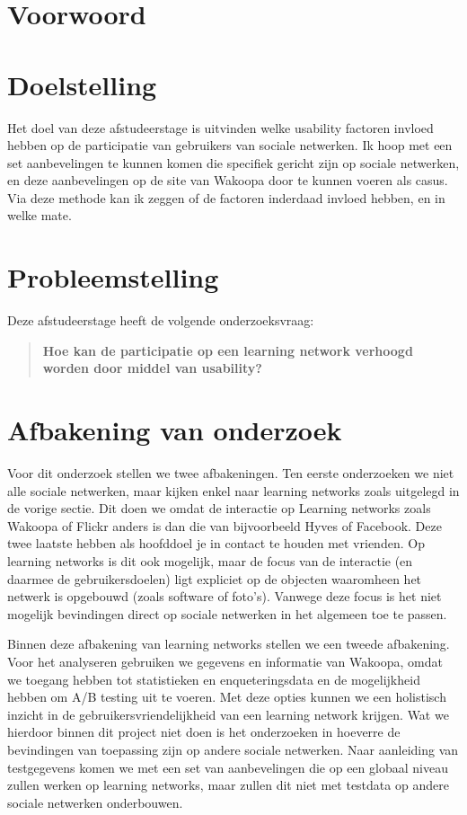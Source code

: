 \documentclass[a4paper, 10pt, pdftex]{report}
\begin{document}
  \newpage
  \section*{Voorwoord}

  \newpage
  \section*{Doelstelling}
    Het doel van deze afstudeerstage is uitvinden welke usability factoren invloed hebben op de participatie van gebruikers van sociale netwerken. Ik hoop met een set aanbevelingen te kunnen komen die specifiek gericht zijn op sociale netwerken, en deze aanbevelingen op de site van Wakoopa door te kunnen voeren als casus. Via deze methode kan ik zeggen of de factoren inderdaad invloed hebben, en in welke mate.

  \section*{Probleemstelling}
    Deze afstudeerstage heeft de volgende onderzoeksvraag:
    \begin{quotation}
     \textbf{Hoe kan de participatie op een learning network verhoogd worden door middel van usability?}
    \end{quotation}

  \section*{Afbakening van onderzoek}
    Voor dit onderzoek stellen we twee afbakeningen. Ten eerste onderzoeken we niet alle sociale netwerken, maar kijken enkel naar learning networks zoals uitgelegd in de vorige sectie. Dit doen we omdat de interactie op Learning networks zoals Wakoopa of Flickr anders is dan die van bijvoorbeeld Hyves of Facebook. Deze twee laatste hebben als hoofddoel je in contact te houden met vrienden. Op learning networks is dit ook mogelijk, maar de focus van de interactie (en daarmee de gebruikersdoelen) ligt expliciet op de objecten waaromheen het netwerk is opgebouwd (zoals software of foto's). Vanwege deze focus is het niet mogelijk bevindingen direct op sociale netwerken in het algemeen toe te passen.

    Binnen deze afbakening van learning networks stellen we een tweede afbakening. Voor het analyseren gebruiken we gegevens en informatie van Wakoopa, omdat we toegang hebben tot statistieken en enqueteringsdata en de mogelijkheid hebben om A/B testing uit te voeren. Met deze opties kunnen we een holistisch inzicht in de gebruikersvriendelijkheid van een learning network krijgen. Wat we hierdoor binnen dit project niet doen is het onderzoeken in hoeverre de bevindingen van toepassing zijn op andere sociale netwerken. Naar aanleiding van testgegevens komen we met een set van aanbevelingen die op een globaal niveau zullen werken op learning networks, maar zullen dit niet met testdata op andere sociale netwerken onderbouwen.
\end{document}
